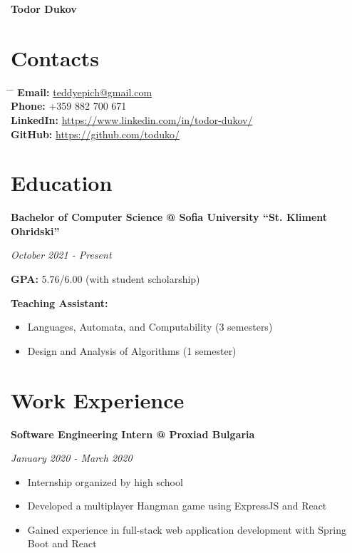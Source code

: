 \documentclass[a4paper,10pt]{article}
\begin{document}
\begin{center}
    \huge{\textbf{Todor Dukov}}
\end{center}

\section*{Contacts}

\begin{tabbing}
    \hspace{4cm} \= \hspace{8cm} \= \kill
    \textbf{Email:} \> \href{mailto:teddyepich@gmail.com}{teddyepich@gmail.com} \\
    \textbf{Phone:} \> +359 882 700 671 \\
    \textbf{LinkedIn:} \> \href{https://www.linkedin.com/in/todor-dukov/}{https://www.linkedin.com/in/todor-dukov/} \\
    \textbf{GitHub:} \> \href{https://github.com/toduko/}{https://github.com/toduko/} \\
\end{tabbing}

\section*{Education}

\textbf{Bachelor of Computer Science @ Sofia University “St. Kliment Ohridski”}

\textit{October 2021 - Present}

\textbf{GPA:} 5.76/6.00 (with student scholarship)

\textbf{Teaching Assistant:}
\begin{itemize}
    \item Languages, Automata, and Computability (3 semesters)
    \item Design and Analysis of Algorithms (1 semester)
\end{itemize}

\section*{Work Experience}

\textbf{Software Engineering Intern @ Proxiad Bulgaria}

\textit{January 2020 - March 2020}
\begin{itemize}
    \item Internship organized by high school
    \item Developed a multiplayer Hangman game using ExpressJS and React
    \item Gained experience in full-stack web application development with Spring Boot and React
\end{itemize}
\end{document}
